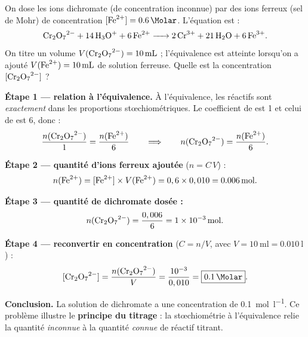 \documentclass[11pt,a4paper]{article}
\begin{document}
\begin{exemple}
On dose les ions dichromate  (de concentration inconnue) par des ions ferreux
 (sel de Mohr) de concentration $[\ce{Fe^2+}]=\SI{0,6}{\Molar}$. L'équation est :
\[
\ce{Cr2O7^2- + 14 H3O+ + 6 Fe^2+ -> 2 Cr^3+ + 21 H2O + 6 Fe^3+}.
\]
On titre un volume $V(\ce{Cr2O7^2-})=\SI{10}{\milli\litre}$ ; l'équivalence est atteinte lorsqu'on
a ajouté $V(\ce{Fe^2+})=\SI{10}{\milli\litre}$ de solution ferreuse. Quelle est la concentration
$[\ce{Cr2O7^2-}]$ ?

\smallskip
\textbf{Étape 1 — relation à l'équivalence.} À l'équivalence, les réactifs sont \emph{exactement}
dans les proportions stœchiométriques. Le coefficient de  est 1 et celui de
 est 6, donc :
\[
\frac{n(\ce{Cr2O7^2-})}{1}=\frac{n(\ce{Fe^2+})}{6}\qquad\Longrightarrow\qquad n(\ce{Cr2O7^2-})=\frac{n(\ce{Fe^2+})}{6}.
\]

\textbf{Étape 2 — quantité d'ions ferreux ajoutée} ($n=C\,V$) :
\[
n(\ce{Fe^2+})=[\ce{Fe^2+}]\times V(\ce{Fe^2+})=0,6\times0,010=\SI{0,006}{\mole}.
\]

\textbf{Étape 3 — quantité de dichromate dosée :}
\[
n(\ce{Cr2O7^2-})=\frac{0,006}{6}=\SI{1e-3}{\mole}.
\]

\textbf{Étape 4 — reconvertir en concentration} ($C=n/V$, avec $V=\SI{10}{\milli\litre}=\SI{0,010}{\litre}$) :
\[
[\ce{Cr2O7^2-}]=\frac{n(\ce{Cr2O7^2-})}{V}=\frac{10^{-3}}{0,010}=\boxed{\SI{0,1}{\Molar}}.
\]

\textbf{Conclusion.} La solution de dichromate a une concentration de \SI{0,1}{\mole\per\litre}. Ce
problème illustre le \textbf{principe du titrage} : la stœchiométrie à l'équivalence relie la
quantité \emph{inconnue} à la quantité \emph{connue} de réactif titrant.

\begin{center}
\end{center}
\end{exemple}
\end{document}
